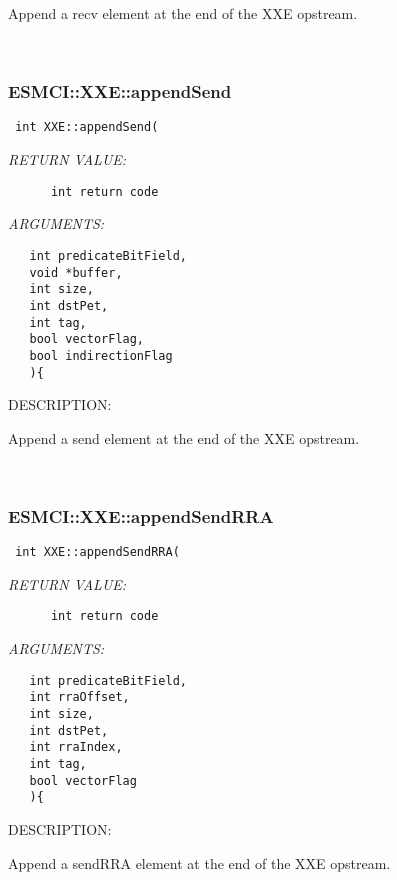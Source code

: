     Append a recv element at the end of the XXE opstream. 
 
\mbox{}\hrulefill\
 
\subsubsection [ESMCI::XXE::appendSend] {ESMCI::XXE::appendSend}


  
\begin{verbatim} int XXE::appendSend(\end{verbatim}{\em RETURN VALUE:}
\begin{verbatim}      int return code\end{verbatim}{\em ARGUMENTS:}
\begin{verbatim}   int predicateBitField,
   void *buffer,
   int size,
   int dstPet,
   int tag,
   bool vectorFlag,
   bool indirectionFlag
   ){\end{verbatim}
{\sf DESCRIPTION:\\ }


    Append a send element at the end of the XXE opstream. 
 
\mbox{}\hrulefill\
 
\subsubsection [ESMCI::XXE::appendSendRRA] {ESMCI::XXE::appendSendRRA}


  
\begin{verbatim} int XXE::appendSendRRA(\end{verbatim}{\em RETURN VALUE:}
\begin{verbatim}      int return code\end{verbatim}{\em ARGUMENTS:}
\begin{verbatim}   int predicateBitField,
   int rraOffset,
   int size,
   int dstPet,
   int rraIndex,
   int tag,
   bool vectorFlag
   ){\end{verbatim}
{\sf DESCRIPTION:\\ }


    Append a sendRRA element at the end of the XXE opstream. 
 
\mbox{}\hrulefill\
 
